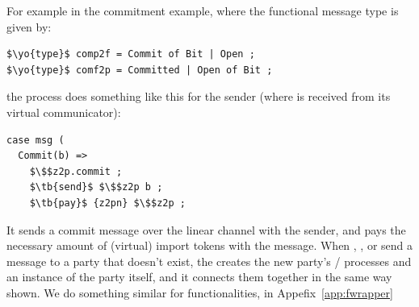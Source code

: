 
For example in the commitment example, where the functional message type is given by: 
\begin{lstlisting}[basicstyle=\small\BeraMonottFamily, mathescape]
$\yo{type}$ comp2f = Commit of Bit | Open ;
$\yo{type}$ comf2p = Committed | Open of Bit ;
\end{lstlisting}
the  process does something like this for the sender (where  is received from its virtual communicator):
\begin{lstlisting}[basicstyle=\small\BeraMonottFamily, frame=single, mathescape]
case msg (
  Commit(b) =>
    $\$$z2p.commit ;
    $\tb{send}$ $\$$z2p b ;
    $\tb{pay}$ {z2pn} $\$$z2p ;
\end{lstlisting}
It sends a commit message over the linear channel with the sender, and pays the necessary amount of (virtual) import tokens with the message.
When \Z, \A, or \F send a message to a party that doesn't exist, the \partywrapper creates the new party's / processes and an instance of the party itself, and it connects them together in the same way shown. 
We do something similar for functionalities, in Appefix~\ref{app:fwrapper}

